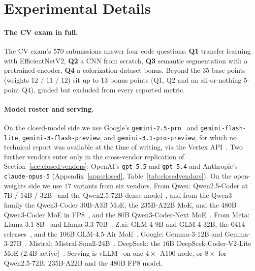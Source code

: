 \clearpage
\appendix

\section{Experimental Details}
\label{app:details}

\paragraph{The CV exam in full.}
The CV exam's $570$ submissions answer four code questions: \textbf{Q1} transfer learning with EfficientNetV2, \textbf{Q2} a CNN from scratch, \textbf{Q3} semantic segmentation with a pretrained encoder, \textbf{Q4} a colorization-dataset bonus. Beyond the $35$ base points (weights $12$ / $11$ / $12$) sit up to $13$ bonus points (Q1, Q2 and an all-or-nothing $5$-point Q4), graded but excluded from every reported metric.

\paragraph{Model roster and serving.}
On the closed-model side we use Google's \texttt{gemini-2.5-pro}~\citep{comanici2025gemini25pushingfrontier} and \texttt{gemini-flash-lite}, \texttt{gemini-3-flash-preview}, and \texttt{gemini-3.1-pro-preview}, for which no technical report was available at the time of writing, via the Vertex API~\citep{geminiteam2025geminifamilyhighlycapable}. Two further vendors enter only in the cross-vendor replication of Section~\ref{sec:closed:vendors}: OpenAI's \texttt{gpt-5.5} and \texttt{gpt-5.4} and Anthropic's \texttt{claude-opus-5} (Appendix~\ref{app:closed}, Table~\ref{tab:closedvendors}). On the open-weights side we use $17$ variants from six vendors. From Qwen: Qwen2.5-Coder at $7$B / $14$B / $32$B~\citep{hui2024qwen25codertechnicalreport} and the Qwen2.5 $72$B dense model~\citep{qwen2025qwen25technicalreport}, and from the Qwen3 family the Qwen3-Coder $30$B-A$3$B MoE, the $235$B-A$22$B MoE, and the $480$B Qwen3-Coder MoE in FP8~\citep{yang2025qwen3technicalreport}, and the $80$B Qwen3-Coder-Next MoE~\citep{qwen2026qwen3codernext}. From Meta: Llama-3.1-$8$B~\citep{grattafiori2024llama3herdmodels} and Llama-3.3-$70$B~\citep{meta2024llama33modelcard}. Z.ai: GLM-4-$9$B and GLM-4-$32$B, the $0414$ releases~\citep{glm2024chatglmfamilylargelanguage,zai2025glm49b0414,zai2025glm432b0414}, and the $106$B GLM-4.5-Air MoE~\citep{glm45team2025glm45agenticreasoningcoding}. Google: Gemma-3-$12$B and Gemma-3-$27$B~\citep{gemmateam2025gemma3technicalreport}. Mistral: Mistral-Small-$24$B~\citep{mistral2025small24binstruct2501}. DeepSeek: the $16$B DeepSeek-Coder-V2-Lite MoE ($2.4$B active)~\citep{deepseekai2024deepseekcoderv2breakingbarrierclosedsource}. Serving is vLLM~\citep{kwon2023efficientmemorymanagementlarge} on one $4 \times$~A100 node, or $8 \times$ for Qwen2.5-$72$B, $235$B-A$22$B and the $480$B FP8 model.

